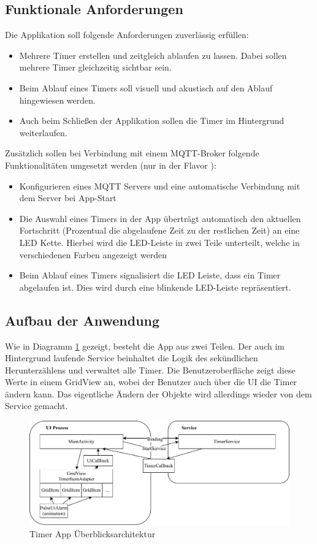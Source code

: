 \subsection{Funktionale Anforderungen}
Die Applikation soll folgende Anforderungen zuverlässig erfüllen:
\begin{itemize}
	\item Mehrere Timer erstellen und zeitgleich ablaufen zu lassen. Dabei sollen mehrere Timer gleichzeitig sichtbar sein.
	\item Beim Ablauf eines Timers soll visuell und akustisch auf den Ablauf hingewiesen werden.
	\item Auch beim Schließen der Applikation sollen die Timer im Hintergrund weiterlaufen.
\end{itemize}
Zusätzlich sollen bei Verbindung mit einem MQTT-Broker folgende Funktionalitäten umgesetzt werden (nur in der Flavor ):
\begin{itemize}
	\item Konfigurieren eines MQTT Servers und eine automatische Verbindung mit dem Server bei App-Start
	\item Die Auswahl eines Timers in der App überträgt automatisch den aktuellen Fortschritt (Prozentual die abgelaufene Zeit zu der restlichen Zeit) an eine LED Kette. Hierbei wird die LED-Leiste in zwei Teile unterteilt, welche in verschiedenen Farben angezeigt werden
	\item Beim Ablauf eines Timers signalisiert die LED Leiste, dass ein Timer abgelaufen ist. Dies wird durch eine blinkende LED-Leiste repräsentiert.
\end{itemize}

\subsection{Aufbau der Anwendung}
Wie in Diagramm \ref{fig:timerapparchitektur} gezeigt, besteht die App aus zwei Teilen. Der auch im Hintergrund laufende Service beinhaltet die Logik des sekündlichen Herunterzählens und verwaltet alle Timer. Die Benutzeroberfläche zeigt diese Werte in einem GridView an, wobei der Benutzer auch über die UI die Timer ändern kann. Das eigentliche Ändern der Objekte wird allerdings wieder von dem Service gemacht.
\begin{figure}
	\centering
	\includegraphics[width=\linewidth]{../images/timer_app_architektur}
	\caption[Timer App Überblick]{Timer App Überblicksarchitektur}
	\label{fig:timerapparchitektur}
\end{figure}


